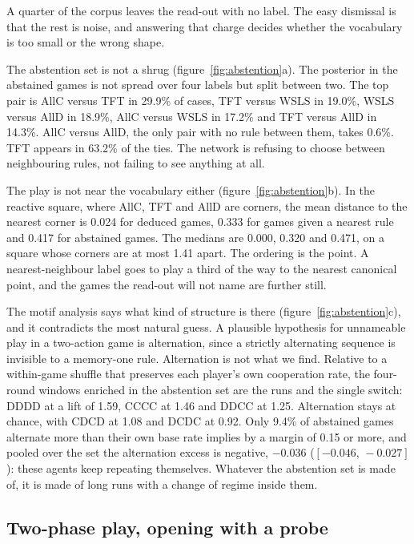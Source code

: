 \documentclass[11pt,a4paper]{article}
\newcommand{\ci}[2]{[#1,\,#2]}
\begin{document}
A quarter of the corpus leaves the read-out with no label. The easy dismissal
is that the rest is noise, and answering that charge decides whether the
vocabulary is too small or the wrong shape.

The abstention set is not a shrug (figure~\ref{fig:abstention}a). The
posterior in the abstained games is not spread over four labels but split
between two. The top pair is AllC versus TFT in 29.9\% of cases, TFT versus
WSLS in 19.0\%, WSLS versus AllD in 18.9\%, AllC versus WSLS in 17.2\% and TFT
versus AllD in 14.3\%. AllC versus AllD, the only pair with no rule between
them, takes 0.6\%. TFT appears in 63.2\% of the ties. The network is refusing
to choose between neighbouring rules, not failing to see anything at all.

The play is not near the vocabulary either (figure~\ref{fig:abstention}b). In
the reactive square, where AllC, TFT and AllD are corners, the mean distance
to the nearest corner is 0.024 for deduced games, 0.333 for games given a
nearest rule and 0.417 for abstained games. The medians are 0.000, 0.320 and
0.471, on a square whose corners are at most 1.41 apart. The ordering is the
point. A nearest-neighbour label goes to play a third of the way to the
nearest canonical point, and the games the read-out will not name are further
still.

The motif analysis says what kind of structure is there
(figure~\ref{fig:abstention}c), and it contradicts the most natural guess. A
plausible hypothesis for unnameable play in a two-action game is alternation,
since a strictly alternating sequence is invisible to a memory-one rule.
Alternation is not what we find. Relative to a within-game shuffle that
preserves each player's own cooperation rate, the four-round windows enriched
in the abstention set are the runs and the single switch: DDDD at a lift of
1.59, CCCC at 1.46 and DDCC at 1.25. Alternation stays at chance, with CDCD at
1.08 and DCDC at 0.92. Only 9.4\% of abstained games alternate more than their
own base rate implies by a margin of 0.15 or more, and pooled over the set the
alternation excess is negative, $-0.036$ ($\ci{-0.046}{-0.027}$): these agents
keep repeating themselves. Whatever the abstention set is made of, it is made
of long runs with a change of regime inside them.

\subsection{Two-phase play, opening with a probe}
\label{sec:hidden}
\end{document}
